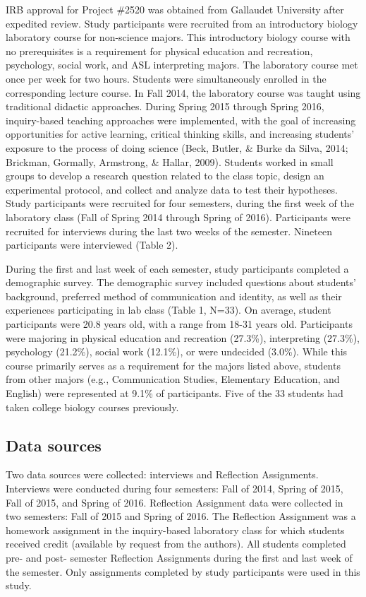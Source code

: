 \documentclass[11.5pt]{sig-alternate} %
\begin{document}
\begin{large}
IRB approval for Project \#2520 was obtained from Gallaudet University after expedited review. Study participants were recruited from an introductory biology laboratory course for non-science majors. This introductory biology course with no prerequisites is a requirement for physical education and recreation, psychology, social work, and ASL interpreting majors. The laboratory course met once per week for two hours. Students were simultaneously enrolled in the corresponding lecture course. In Fall 2014, the laboratory course was taught using traditional didactic approaches. During Spring 2015 through Spring 2016, inquiry-based teaching approaches were implemented, with the goal of increasing opportunities for active learning, critical thinking skills, and increasing students’ exposure to the process of doing science (Beck, Butler, \& Burke da Silva, 2014; Brickman, Gormally, Armstrong, \& Hallar, 2009). Students worked in small groups to develop a research question related to the class topic, design an experimental protocol, and collect and analyze data to test their hypotheses. Study participants were recruited for four semesters, during the first week of the laboratory class (Fall of Spring 2014 through Spring of 2016). Participants were recruited for interviews during the last two weeks of the semester. Nineteen participants were interviewed (Table 2). 

During the first and last week of each semester, study participants completed a demographic survey. The demographic survey included questions about students’ background, preferred method of communication and identity, as well as their experiences participating in lab class (Table 1, N=33). On average, student participants were 20.8 years old, with a range from 18-31 years old. Participants were majoring in physical education and recreation (27.3\%), interpreting (27.3\%), psychology (21.2\%), social work (12.1\%), or were undecided (3.0\%). While this course primarily serves as a requirement for the majors listed above, students from other majors (e.g., Communication Studies, Elementary Education, and English) were represented at 9.1\% of participants. Five of the 33 students had taken college biology courses previously.

\subsection*{Data sources}

Two data sources were collected: interviews and Reflection Assignments. Interviews were conducted during four semesters: Fall of 2014, Spring of 2015, Fall of 2015, and Spring of 2016. Reflection Assignment data were collected in two semesters: Fall of 2015 and Spring of 2016. The Reflection Assignment was a homework assignment in the inquiry-based laboratory class for which students received credit (available by request from the authors). All students completed pre- and post- semester Reflection Assignments during the first and last week of the semester. Only assignments completed by study participants were used in this study. 


\end{large}
\end{document}
